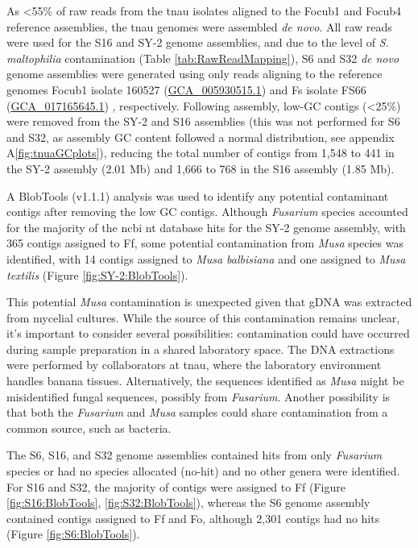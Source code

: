 As <55\% of raw reads from the \ac{tnau} isolates aligned to the \ac{Focub1} and \ac{Focub4} reference assemblies, the \ac{tnau} genomes were assembled \textit{de novo}. All raw reads were used for the S16 and SY-2 genome assemblies, and due to the level of \textit{S. maltophilia} contamination (Table \ref{tab:RawReadMapping}), S6 and S32 \textit{de novo} genome assemblies were generated using only reads aligning to the reference genomes \ac{Focub1} isolate 160527 (\href{https://www.ncbi.nlm.nih.gov/datasets/genome/GCA_005930515.1/}{GCA\_005930515.1}) \parencite{Asai2019} and \ac{Fs} isolate FS66 (\href{https://www.ncbi.nlm.nih.gov/datasets/genome/GCA_017165645.1/}{GCA\_017165645.1}) \parencite{Cui2021}, respectively. Following assembly, low-GC contigs  (\textless 25\%) were removed from the SY-2 and S16 assemblies (this was not performed for S6 and S32, as assembly GC content followed a normal distribution, see appendix A\ref{fig:tnuaGCplots}), reducing the total number of contigs from 1,548 to 441 in the SY-2 assembly (2.01 Mb) and 1,666 to 768 in the S16 assembly (1.85 Mb).  

A BlobTools (v1.1.1) analysis was used to identify any potential contaminant contigs after removing the low GC contigs. Although \textit{Fusarium} species accounted for the majority of the \ac{ncbi} nt database hits for the SY-2 genome assembly, with 365 contigs assigned to \ac{Ff}, some potential contamination from \textit{Musa} species was identified, with 14 contigs assigned to \textit{Musa balbisiana} and one assigned to \textit{Musa textilis} (Figure \ref{fig:SY-2:BlobTools}). 

This potential \textit{Musa} contamination is unexpected given that gDNA was extracted from mycelial cultures. While the source of this contamination remains unclear, it's important to consider several possibilities: contamination could have occurred during sample preparation in a shared laboratory space. The DNA extractions were performed by collaborators at \ac{tnau}, where the laboratory environment handles banana tissues. Alternatively, the sequences identified as \textit{Musa} might be misidentified fungal sequences, possibly from \textit{Fusarium}. Another possibility is that both the \textit{Fusarium} and \textit{Musa} samples could share contamination from a common source, such as bacteria.

The S6, S16, and S32 genome assemblies contained hits from only \textit{Fusarium} species or had no species allocated (no-hit) and no other genera were identified. For S16 and S32, the majority of contigs were assigned to \acf{Ff} (Figure \ref{fig:S16:BlobTools}, \ref{fig:S32:BlobTools}), whereas the  S6 genome assembly contained contigs assigned to \ac{Ff} and \ac{Fo}, although 2,301 contigs had no hits (Figure \ref{fig:S6:BlobTools}).  

